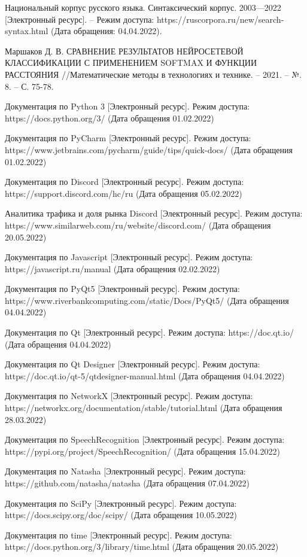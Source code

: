 \begin{thebibliography}{}
	 Национальный корпус русского языка. Синтаксический корпус. 2003—2022 [Электронный ресурс]. -- Режим доступа: https://ruscorpora.ru/new/search-syntax.html (Дата обращения: 04.04.2022).
	
	Маршаков Д. В. СРАВНЕНИЕ РЕЗУЛЬТАТОВ НЕЙРОСЕТЕВОЙ КЛАССИФИКАЦИИ С ПРИМЕНЕНИЕМ SOFTMAX И ФУНКЦИИ РАССТОЯНИЯ //Математические методы в технологиях и технике. – 2021. – №. 8. – С. 75-78.
	
	 Документация по Python 3 [Электронный ресурс]. Режим доступа: https://docs.python.org/3/ (Дата обращения 01.02.2022)
	
	 Документация по PyCharm [Электронный ресурс]. Режим доступа: https://www.jetbrains.com/pycharm/guide/tips/quick-docs/ (Дата обращения 01.02.2022)
	
	 Документация по Discord [Электронный ресурс]. Режим доступа: https://support.discord.com/hc/ru (Дата обращения 05.02.2022)
	
	 Аналитика трафика и доля рынка Discord [Электронный ресурс]. Режим доступа: https://www.similarweb.com/ru/website/discord.com/ (Дата обращения 20.05.2022)
	
	 Документация по Javascript [Электронный ресурс]. Режим доступа: https://javascript.ru/manual (Дата обращения 02.02.2022)
	
	 Документация по PyQt5 [Электронный ресурс]. Режим доступа: https://www.riverbankcomputing.com/static/Docs/PyQt5/ (Дата обращения 04.04.2022)
	
	 Документация по Qt [Электронный ресурс]. Режим доступа:  https://doc.qt.io/ (Дата обращения 04.04.2022)
	
	 Документация по Qt Designer [Электронный ресурс]. Режим доступа: https://doc.qt.io/qt-5/qtdesigner-manual.html (Дата обращения 04.04.2022)
	
	 Документация по NetworkX [Электронный ресурс]. Режим доступа: https://networkx.org/documentation/stable/tutorial.html (Дата обращения 28.03.2022)
	
	 Документация по SpeechRecognition [Электронный ресурс]. Режим доступа: https://pypi.org/project/SpeechRecognition/ (Дата обращения 15.04.2022)
	
	 Документация по Natasha [Электронный ресурс]. Режим доступа: https://github.com/natasha/natasha (Дата обращения 07.04.2022)
		
	 Документация по SciPy [Электронный ресурс]. Режим доступа: https://docs.scipy.org/doc/scipy/ (Дата обращения 10.05.2022)
	
	 Документация по time [Электронный ресурс]. Режим доступа: 	https://docs.python.org/3/library/time.html (Дата обращения 20.05.2022)
	
	
	
	
\end{thebibliography}
\endgroup

\pagebreak